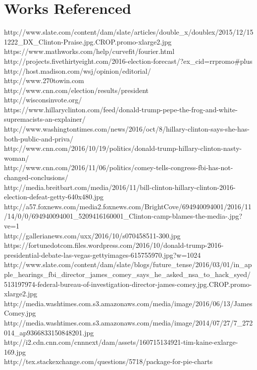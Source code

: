 \documentclass[twoside]{article}
\begin{document}
              \section{Works Referenced}
              http://www.slate.com/content/dam/slate/articles/double\_x/doublex/2015/12/151222\_DX\_Clinton-Praise.jpg.CROP.promo-xlarge2.jpg\\
              https://www.mathworks.com/help/curvefit/fourier.html\\
              http://projects.fivethirtyeight.com/2016-election-forecast/?ex\_cid=rrpromo\#plus\\
              http://host.madison.com/wsj/opinion/editorial/\\
              http://www.270towin.com\\
              http://www.cnn.com/election/results/president\\
              http://wisconsinvote.org/\\
              https://www.hillaryclinton.com/feed/donald-trump-pepe-the-frog-and-white-supremacists-an-explainer/\\
              http://www.washingtontimes.com/news/2016/oct/8/hillary-clinton-says-she-has-both-public-and-priva/\\
              http://www.cnn.com/2016/10/19/politics/donald-trump-hillary-clinton-nasty-woman/\\
              http://www.cnn.com/2016/11/06/politics/comey-tells-congress-fbi-has-not-changed-conclusions/\\
              http://media.breitbart.com/media/2016/11/bill-clinton-hillary-clinton-2016-election-defeat-getty-640x480.jpg\\
              http://a57.foxnews.com/media2.foxnews.com/BrightCove/694940094001/2016/11/14/0/0/694940094001\_5209416160001\_Clinton-camp-blames-the-media-.jpg?ve=1\\
              http://gallerianews.com/uxx/2016/10/s070458511-300.jpg\\
              https://fortunedotcom.files.wordpress.com/2016/10/donald-trump-2016-presidential-debate-las-vegas-gettyimages-615755970.jpg?w=1024\\
              http://www.slate.com/content/dam/slate/blogs/future\_tense/2016/03/01/in\_apple\_hearings\_fbi\_director\_james\_comey\_says\_he\_asked\_nsa\_to\_hack\_syed/513197974-federal-bureau-of-investigation-director-james-comey.jpg.CROP.promo-xlarge2.jpg\\
              http://media.washtimes.com.s3.amazonaws.com/media/image/2016/06/13/JamesComey.jpg\\
              http://media.washtimes.com.s3.amazonaws.com/media/image/2014/07/27/7\_272014\_ap9366833150848201.jpg\\
              http://i2.cdn.cnn.com/cnnnext/dam/assets/160715134921-tim-kaine-exlarge-169.jpg\\
              http://tex.stackexchange.com/questions/5718/package-for-pie-charts\\
              
\end{document}
